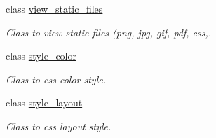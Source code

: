 \begin{CompactItemize}
class \hyperlink{classweb__winsol_1_1view__static__files}{view\_\-static\_\-files}
\begin{CompactList}\small\item\em Class to view static files (png, jpg, gif, pdf, css,. \item\end{CompactList}\item 
class \hyperlink{classweb__winsol_1_1style__color}{style\_\-color}
\begin{CompactList}\small\item\em Class to css color style. \item\end{CompactList}\item 
class \hyperlink{classweb__winsol_1_1style__layout}{style\_\-layout}
\begin{CompactList}\small\item\em Class to css layout style. \item\end{CompactList}\end{CompactItemize}
